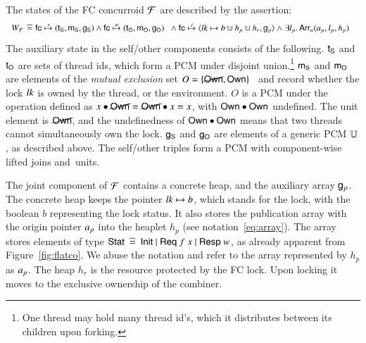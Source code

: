 The states of the FC concurroid $\mathcal{F}$ are described by the assertion:
% 
%
\[
{\small
\begin{array}{c}
  W_{\fccon} \!\eqdef\! 
  \hfc \spts (\tS, \mS, \gS) \aand 
  \hfc \opts (\tO, \mO, \gO) \begin{array}[t]{l}
    \hbox{}\aand \hfc \jpts {\angled{\lk \hpts b \hunion h_p \hunion h_r, \gp}} \aand \exists l_p\ldot \Array{\ap}{n}{l_p}{h_p} 
\end{array}
\end{array}
}
\]
%
The auxiliary state in the self/other components consists of the
following. $\mathsf{t}_{{\mathsf{S}}}$ and $\mathsf{t}_{{\mathsf{O}}}$ are sets of thread ids, which form a PCM
under disjoint union.\footnote{One thread may hold many thread id's,
  which it distributes between its children upon forking.}
%
$\mathsf{m}_{{\mathsf{S}}}$ and $\mathsf{m}_{{\mathsf{O}}}$ are elements of the \emph{mutual exclusion} set $O =
\{\cancel{\mathsf{Own}},
\mathsf{Own}\}$~\cite{LeyWild-Nanevski:POPL13,Nanevski-al:ESOP14} and
record whether the lock $\mathit{lk}$ is owned by the thread, or the
environment. $O$ is a PCM under the operation defined as $x
\bullet \cancel{\mathsf{Own}} = \cancel{\mathsf{Own}} \bullet x = x$, with $\mathsf{Own} \bullet
\mathsf{Own}$ undefined. The unit element is $\cancel{\mathsf{Own}}$, and the
undefinedness of $\mathsf{Own} \bullet \mathsf{Own}$ means that two threads
cannot simultaneously own the lock.
%
$\mathsf{g}_{{\mathsf{S}}}$ and $\mathsf{g}_{{\mathsf{O}}}$ are elements of a generic PCM $\mathbb{U}$, as
described above.
% 
The self/other triples form a PCM with component-wise lifted joins
and~units.
 
The joint component of $\mathcal{F}$ contains a concrete heap, and the
auxiliary array $\mathsf{g}_{p}$.
%
The concrete heap keeps the pointer $\mathit{lk} \mapsto b$, which stands for
the lock, with the boolean $b$ representing the lock status. It also
stores the publication array with the origin pointer $\text{\emph{a}}_p$ into the
heaplet $h_p$ (see notation~\eqref{eq:array}). The array stores
elements of type $\mathsf{Stat} \mathrel{\:\widehat{=}\:} \mathsf{Init}~|~\mathsf{Req}\ {f}~{x}~|~\mathsf{Resp}\ {w}$,
as already apparent from Figure~\ref{fig:flatco}.  We abuse the
notation and refer to the array represented by $h_p$ as $\text{\emph{a}}_p$.
%
The heap $h_r$ is the resource protected by the FC lock. Upon locking
it moves to the exclusive ownership of the combiner. 


